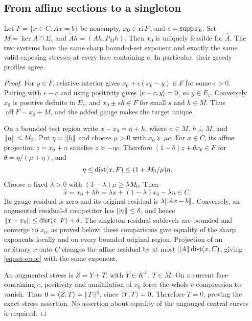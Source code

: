 \subsection{From affine sections to a singleton}
\begin{lemma}\label{lem:gauge}
Let $F=\{x\in C:Ax=b\}$ be nonempty, $x_0\in\operatorname{ri} F$, and $c=\operatorname{supp} x_0$. Set $M=\ker A\cap E_c$ and $\widehat A h=(Ah,P_Mh)$. Then $x_0$ is uniquely feasible for $\widehat A$. The two systems have the same sharp bounded-set exponent and exactly the same valid exposing stresses at every face containing $c$. In particular, their greedy profiles agree.
\end{lemma}
\begin{proof}
For $y\in F$, relative interior gives $x_0+\epsilon(x_0-y)\in F$ for some $\epsilon>0$. Pairing with $e-c$ and using positivity gives $\langle e-c,y\rangle=0$, so $y\in E_c$. Conversely $x_0$ is positive definite in $E_c$, and $x_0\pm s h\in F$ for small $s$ and $h\in M$. Thus $\operatorname{aff}F=x_0+M$, and the added gauge makes the target unique.

On a bounded test region write $x-x_0=n+h$, where $n\in M$, $h\perp M$, and $\lVert n\rVert\le M_0$. Put $\eta=\lVert h\rVert$ and choose $\mu>0$ with $x_0\succeq\mu c$. For $x\in C$, its affine projection $z=x_0+n$ satisfies $z\succeq-\eta c$. Therefore $(1-\theta)z+\theta x_0\in F$ for $\theta=\eta/(\mu+\eta)$, and
\begin{equation}\label{eq:gauge-distance}
 \eta\le\operatorname{dist}(x,F)\le(1+M_0/\mu)\eta.
\end{equation}
Choose a fixed $\lambda>0$ with $(1-\lambda)\mu\ge\lambda M_0$. Then
\[
 \widehat x=x_0+\lambda h
 =\lambda x+(1-\lambda)x_0-\lambda n\in C.
\]
Its gauge residual is zero and its original residual is $\lambda\lVert Ax-b\rVert$. Conversely, an augmented residual-$\delta$ competitor has $\lVert n\rVert\le\delta$, and hence $\lVert x-x_0\rVert\le\operatorname{dist}(x,F)+\delta$. The singleton residual sublevels are bounded and converge to $x_0$, as proved below; these comparisons give equality of the sharp exponents locally and on every bounded original region. Projection of an arbitrary $x$ onto $C$ changes the affine residual by at most $\lVert A\rVert\operatorname{dist}(x,C)$, giving \eqref{eq:set-error} with the same exponent.

An augmented stress is $Z=Y+T$, with $Y\in K^\perp$, $T\in M$. On a current face containing $c$, positivity and annihilation of $x_0$ force the whole $c$-compression to vanish. Thus $0=\langle Z,T\rangle=\lVert T\rVert^2$, since $\langle Y,T\rangle=0$. Therefore $T=0$, proving the exact stress assertion. No assertion about equality of the ungauged central curves is required.
\end{proof}

